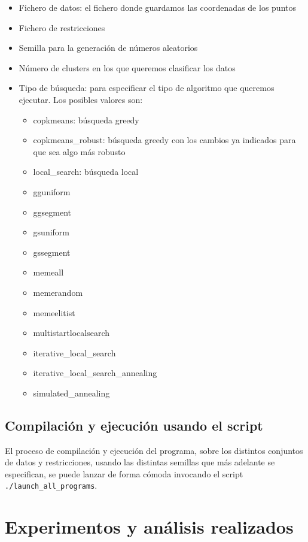 \documentclass[11pt]{article}
\begin{document}
\begin{itemize}
    \item Fichero de datos: el fichero donde guardamos las coordenadas de los puntos
    \item Fichero de restricciones
    \item Semilla para la generación de números aleatorios
    \item Número de clusters en los que queremos clasificar los datos
    \item Tipo de búsqueda: para especificar el tipo de algoritmo que queremos ejecutar. Los posibles valores son:
    \begin{itemize}
        \item copkmeans: búsqueda greedy
        \item copkmeans\_robust: búsqueda greedy con los cambios ya indicados para que sea algo más robusto
        \item local\_search: búsqueda local
        \item gguniform
        \item ggsegment
        \item gsuniform
        \item gssegment
        \item memeall
        \item memerandom
        \item memeelitist
        \item multistartlocalsearch
        \item iterative\_local\_search
        \item iterative\_local\_search\_annealing
        \item simulated\_annealing
    \end{itemize}
\end{itemize}

\subsection{Compilación y ejecución usando el script}

El proceso de compilación y ejecución del programa, sobre los distintos conjuntos de datos y restricciones, usando las distintas semillas que más adelante se especifican, se puede lanzar de forma cómoda invocando el script \lstinline{./launch_all_programs}.

\pagebreak

\section{Experimentos y análisis realizados}
\end{document}
